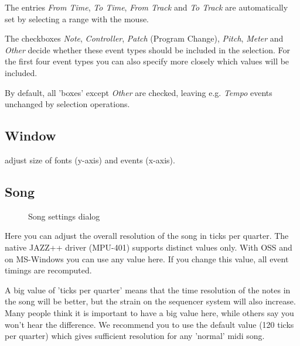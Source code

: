 \documentclass[letterpaper]{report}
\begin{document}
The entries {\em From Time}, {\em To Time}, {\em From Track} and
{\em To Track} are automatically set by selecting a range with the mouse.

The checkboxes {\em Note}, {\em Controller}, {\em Patch} (Program Change),
{\em Pitch}, {\em Meter} and {\em Other} decide whether these event types
should be included in the selection. For the first four event types you can
also specify more closely which values will be included.

By default, all 'boxes' except {\em Other} are checked, leaving e.g.
{\em Tempo} events unchanged by selection operations.

\subsection{Window}
adjust size of fonts (y-axis) and events (x-axis).



\subsection{Song}\label{songset}

\begin{figure}
\caption{Song settings dialog}
\end{figure}

Here you can adjust the overall resolution of the song in ticks per quarter.
The native JAZZ++ driver (MPU-401) supports distinct values only. With OSS
and on MS-Windows you can use any value here. If you change this value,
all event timings are recomputed.

A big value of 'ticks per quarter' means that the time resolution of the
notes in the song will be better, but the strain on the sequencer system
will also increase. Many people think it is important to have a big value here,
while others say you won't hear the difference. We recommend you to use
the default value (120 ticks per quarter) which gives sufficient resolution
for any 'normal' midi song.
\end{document}
